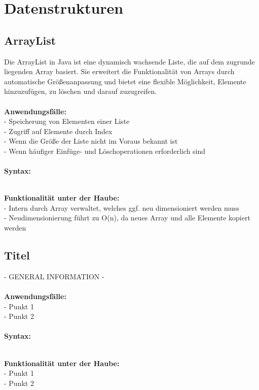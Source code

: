 \documentclass[../main.tex]{subfiles}
\begin{document}
	
	\section{Datenstrukturen}
%		 
	
		\subsection{ArrayList}
		Die ArrayList in Java ist eine dynamisch wachsende Liste, die auf dem zugrunde liegenden Array basiert.
		Sie erweitert die Funktionalität von Arrays durch automatische Größenanpassung und bietet eine flexible Möglichkeit, Elemente hinzuzufügen, zu löschen und darauf zuzugreifen. \\\\
		\textbf{Anwendungsfälle:}\\
		- Speicherung von Elementen einer Liste\\
		- Zugriff auf Elemente durch Index\\
		- Wenn die Größe der Liste nicht im Voraus bekannt ist\\ 
		- Wenn häufiger Einfüge- und Löschoperationen erforderlich sind\\\\
		\textbf{Syntax:}
		 
		\\
		\textbf{Funktionalität unter der Haube:}\\
		- Intern durch Array verwaltet, welches ggf. neu dimensioniert werden muss\\
		- Neudimensionierung führt zu O(n), da neues Array und alle Elemente kopiert werden\\
		\clearpage
		
		\subsection{Titel}
		- GENERAL INFORMATION -\\\\
		\textbf{Anwendungsfälle:}\\
		- Punkt 1\\
		- Punkt 2\\
		\\
		\textbf{Syntax:}
		 
		\\
		\textbf{Funktionalität unter der Haube:}\\
		- Punkt 1\\
		- Punkt 2\\
		\clearpage
\end{document}
